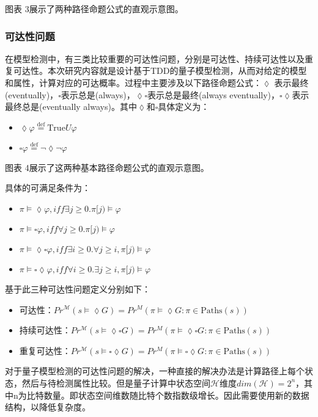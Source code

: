图表 3展示了两种路径命题公式的直观示意图。
 
\subsubsection{可达性问题}
在模型检测中，有三类比较重要的可达性问题，分别是可达性、持续可达性以及重复可达性。本次研究内容就是设计基于TDD的量子模型检测，从而对给定的模型和属性，计算对应的可达概率。过程中主要涉及以下路径命题公式：\(\lozenge\) 表示最终(eventually)，\(\square\)表示总是(always)，\(\lozenge\square\)表示总是最终(always eventually)，\(\square\lozenge\)表示最终总是(eventually always)。其中\(\lozenge\)和\(\square\)具体定义为：
\begin{itemize}
    \item \(\lozenge\varphi\overset{\text{def} }{=} \text{True}U\varphi\)
    \item \(\square\varphi\overset{\text{def} }{=} \neg\lozenge\neg\varphi\)
\end{itemize}
图表 4展示了这两种基本路径命题公式的直观示意图。
 
具体的可满足条件为：
\begin{itemize}
    \item \(\pi\models\lozenge\varphi,iff\exists j\ge0.\pi[j)\models\varphi\)
    \item \(\pi\models\square\varphi,iff\forall j\ge 0.\pi[j)\models\varphi\)
    \item \(\pi\models\lozenge\square\varphi,iff\exists i\ge 0.\forall j\ge i,\pi[j)\models\varphi\)
    \item \(\pi\models\square\lozenge\varphi,iff\forall i\ge 0.\exists j\ge i,\pi[j)\models\varphi\)
\end{itemize}
基于此三种可达性问题定义分别如下：
\begin{itemize}
    \item 可达性：\( Pr^{\mathcal{M}}(s \models \lozenge G) = Pr^M(\pi \models \lozenge G : \pi \in \text{Paths}(s))\)
    \item 持续可达性：\( Pr^{\mathcal{M}}(s \models \lozenge \square G) = Pr^M(\pi \models \lozenge \square G : \pi \in \text{Paths}(s))\)
    \item 重复可达性：\( Pr^{\mathcal{M}}(s \models\square \lozenge G) = Pr^M(\pi \models \square\lozenge G : \pi \in \text{Paths}(s))\)
\end{itemize}
	
对于量子模型检测的可达性问题的解决，一种直接的解决办法是计算路径上每个状态，然后与待检测属性比较。但是量子计算中状态空间\(\mathcal{H}\)维度\(dim\left(\mathcal{H}\right)=2^n\)，其中n为比特数量。即状态空间维数随比特个数指数级增长。因此需要使用新的数据结构，以降低复杂度。
